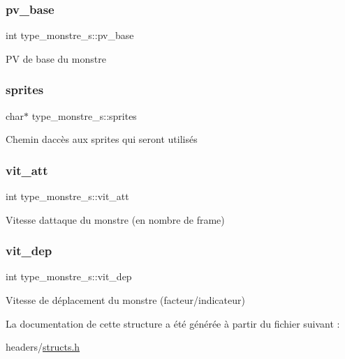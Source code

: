 \subsubsection{\texorpdfstring{pv\+\_\+base}{pv\_base}}
{\footnotesize\ttfamily int type\+\_\+monstre\+\_\+s\+::pv\+\_\+base}

PV de base du monstre \mbox{\label{structtype__monstre__s_a20b80d2c595e2a211a48d548cb02f5f3}} 
\subsubsection{\texorpdfstring{sprites}{sprites}}
{\footnotesize\ttfamily char$\ast$ type\+\_\+monstre\+\_\+s\+::sprites}

Chemin d\textquotesingle{}accès aux sprites qui seront utilisés \mbox{\label{structtype__monstre__s_a5bb66d5b722fc97f901c5eaf7d621fd4}} 
\subsubsection{\texorpdfstring{vit\+\_\+att}{vit\_att}}
{\footnotesize\ttfamily int type\+\_\+monstre\+\_\+s\+::vit\+\_\+att}

Vitesse d\textquotesingle{}attaque du monstre (en nombre de frame) \mbox{\label{structtype__monstre__s_a768470695da3d9377f1e7e97a3c45ed7}} 
\subsubsection{\texorpdfstring{vit\+\_\+dep}{vit\_dep}}
{\footnotesize\ttfamily int type\+\_\+monstre\+\_\+s\+::vit\+\_\+dep}

Vitesse de déplacement du monstre (facteur/indicateur) 

La documentation de cette structure a été générée à partir du fichier suivant \+:\begin{DoxyCompactItemize}
\item 
headers/\hyperlink{structs_8h}{structs.\+h}\end{DoxyCompactItemize}
